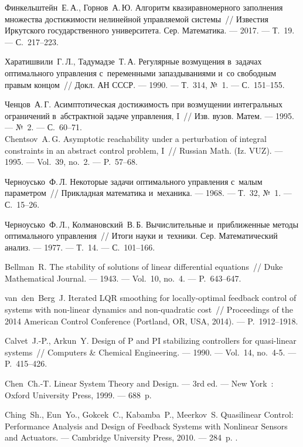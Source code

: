 \documentclass[../main.tex]{subfiles}
\begin{document}
\begin{thebibliography}{99}
Финкельштейн~Е.\,А., Горнов~А.\,Ю. Алгоритм квазиравномерного заполнения множества достижимости нелинейной управляемой системы~// Известия Иркутского государственного университета. Сер. Математика. --- 2017. --- Т.~19. --- С.~217--223.

Харатишвили~Г.\,Л., Тадумадзе~Т.\,А. Регулярные возмущения в~задачах оптимального управления с~переменными запаздываниями и~со свободным правым концом~// Докл. АН СССР. --- 1990. --- Т.~314, №~1. --- С.~151--155.

Ченцов~А.\,Г. Асимптотическая достижимость при возмущении интегральных ограничений в~абстрактной задаче управления, I~// Изв. вузов. Матем. --- 1995. --- №~2. --- С.~60--71.
\\
Chentsov~A.\,G. Asymptotic reachability under a perturbation of integral constraints in an abstract control problem, I~// Russian Math. (Iz. VUZ). --- 1995. --- Vol.~39, no.~2. --- P.~57--68.

Черноусько~Ф.\,Л. Некоторые задачи оптимального управления с~малым параметром~// Прикладная математика и~механика. --- 1968. --- Т.~32, №~1. --- С.~15--26.

Черноусько~Ф.\,Л., Колмановский~В.\,Б. Вычислительные и~приближенные методы оптимального управления~// Итоги науки и~техники. Сер. Математический анализ. --- 1977. --- Т.~14. --- С.~101--166.

Bellman~R. The stability of solutions of linear differential equations~// Duke Mathematical Journal. --- 1943. --- Vol.~10, no.~4. --- P.~643--647.

van~den~Berg~J. Iterated LQR smoothing for locally-optimal feedback control of systems with non-linear dynamics and non-quadratic cost~// Proceedings of the 2014 American Control Conference (Portland, OR, USA, 2014). --- P.~1912--1918.

Calvet~J.-P., Arkun~Y. Design of P and PI stabilizing controllers for quasi-linear systems~// Computers \& Chemical Engineering. --- 1990. --- Vol.~14, no.~4-5. --- P.~415--426. 

Chen~Ch.-T. Linear System Theory and Design. --- 3rd ed. --- New York~: Oxford University Press, 1999. --- 688~p.

Ching~Sh., Eun~Yo., Gokcek~C., Kabamba~P., Meerkov~S. Quasilinear Control: Performance Analysis and Design of Feedback Systems with Nonlinear Sensors and Actuators. --- Cambridge University Press, 2010. --- 284~p. . 


\end{thebibliography}
\end{document}
